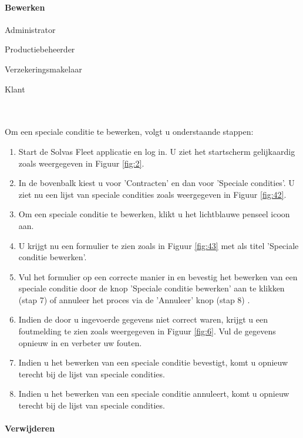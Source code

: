 \documentclass[11pt,openany]{article}
\newcommand{\cmark}{\ding{51}}%
\newcommand{\xmark}{\ding{55}}%
\newcommand{\done}{\rlap{$\square$}{\raisebox{2pt}{\large\hspace{1pt}\cmark}}%
	\hspace{-2.5pt}}
\newcommand{\wontfix}{\rlap{$\square$}{\large\hspace{1pt}\xmark}}
\begin{document}
\paragraph{Bewerken}
\begin{todolist}
	\item[\done] Administrator
	\item[\done] Productiebeheerder
	\item[\done] Verzekeringsmakelaar
	\item[\wontfix] Klant 
\end{todolist}
\\
\\
Om een speciale conditie te bewerken, volgt u onderstaande stappen:
\begin{enumerate}
	\item Start de Solvas Fleet applicatie en log in. U ziet het startscherm gelijkaardig zoals weergegeven in Figuur \ref{fig:2}.
	\item In de bovenbalk kiest u voor 'Contracten' en dan voor 'Speciale condities'. U ziet nu een lijst van speciale condities zoals weergegeven in Figuur \ref{fig:42}.
	\item Om een speciale conditie te bewerken, klikt u het lichtblauwe penseel icoon aan.
	\item U krijgt nu een formulier te zien zoals in Figuur \ref{fig:43} met als titel 'Speciale conditie bewerken'.
	\item Vul het formulier op een correcte manier in en bevestig het bewerken van een speciale conditie door de knop 'Speciale conditie bewerken' aan te klikken (stap 7) of annuleer het proces via de 'Annuleer' knop (stap 8) .
	\item Indien de door u ingevoerde gegevens niet correct waren, krijgt u een foutmelding te zien zoals weergegeven in Figuur \ref{fig:6}. Vul de gegevens opnieuw in en verbeter uw fouten.
	\item Indien u het bewerken van een speciale conditie bevestigt, komt u opnieuw terecht bij de lijst van speciale condities. 
	\item Indien u het bewerken van een speciale conditie annuleert, komt u opnieuw terecht bij de lijst van speciale condities.
	
\end{enumerate}

\paragraph{Verwijderen}
\end{document}

